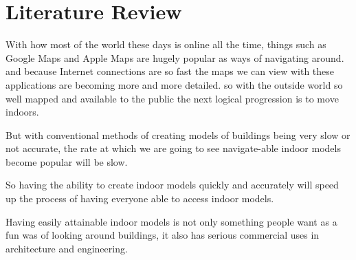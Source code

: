 
\section{Literature Review}


	With how most of the world these days is online all the time, things such as Google Maps and Apple Maps are hugely popular as ways of navigating around. and because Internet connections are so fast the maps we can view with these applications are becoming more and more detailed. so with the outside world so well mapped and available to the public the next logical progression is to move indoors.
	
	But with conventional methods of creating models of buildings being very slow or not accurate, the rate at which we are going to see navigate-able indoor models become popular will be slow.
	
	So having the ability to create indoor models quickly and accurately will speed up the process of having everyone able to access indoor models.
	
	Having easily attainable indoor models is not only something people want as a fun was of looking around buildings, it also has serious commercial uses in architecture and engineering.